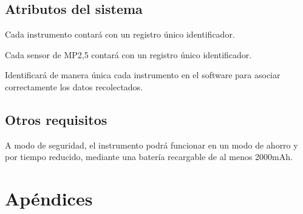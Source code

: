 \documentclass[
11pt, %
codirector, %
]{charter}
\makeatletter
\newcommand{\mytwodigits}[1]{\two@digits{#1}}
\newcounter{reqCounter}
\makeatother
\begin{document}
\subsection{Atributos del sistema}
\label{sec:orgd0babc0}


\begin{description}
	\item[\textbf{[\CODrequerimiento\mytwodigits{\value{reqCounter}}]}]
	Cada instrumento contará con un registro único identificador. 
	
	\item[\textbf{[\CODrequerimiento\mytwodigits{\value{reqCounter}}]}]
	Cada sensor de MP2,5 contará con un registro único identificador. 
	
	\item[\textbf{[\CODrequerimiento\mytwodigits{\value{reqCounter}}]}]
	Identificará de manera única cada instrumento en el software para asociar correctamente los datos recolectados.

\end{description}
\subsection{Otros requisitos}
\label{sec:org31d2978}



\begin{description}
	\item[\textbf{[\CODrequerimiento\mytwodigits{\value{reqCounter}}]}]
	A modo de seguridad, el instrumento podrá funcionar en un modo de ahorro y por tiempo reducido, mediante una batería recargable de al menos 2000mAh.

\end{description}


\newpage


\section{Apéndices}
\label{sec:org75cea03}
\end{document}
